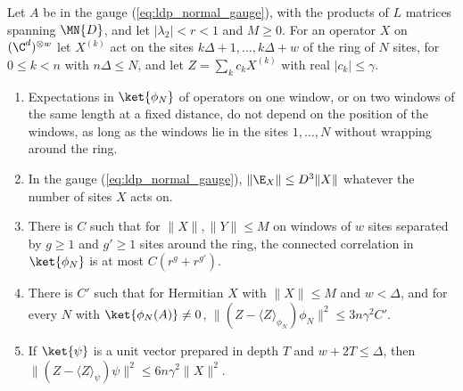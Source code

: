 \begin{lemma}
    \label{lem:ldp_window_averages}
    \leanok
    Let $A$ be in the gauge (\ref{eq:ldp_normal_gauge}), with the products of
    $L$ matrices spanning $\MN{D}$, and let $\lvert\lambda_2\rvert<r<1$ and
    $M\ge0$. For an operator $X$ on $(\C^d)^{\otimes w}$ let $X^{(k)}$ act on
    the sites $k\Delta+1,\dots,k\Delta+w$ of the ring of $N$ sites, for
    $0\le k<n$ with $n\Delta\le N$, and let $Z=\sum_kc_kX^{(k)}$ with real
    $\lvert c_k\rvert\le\gamma$.
    \begin{enumerate}
        \item Expectations in $\ket{\phi_N}$ of operators on one window, or on
              two windows of the same length at a fixed distance, do not depend
              on the position of the windows, as long as the windows lie in the
              sites $1,\dots,N$ without wrapping around the ring.
        \item In the gauge (\ref{eq:ldp_normal_gauge}),
              $\lVert\E_X\rVert\le D^3\lVert X\rVert$ whatever the number of
              sites $X$ acts on.
        \item There is $C$ such that for $\lVert X\rVert,\lVert Y\rVert\le M$
              on windows of $w$ sites separated by $g\ge1$ and $g'\ge1$ sites
              around the ring, the connected correlation in $\ket{\phi_N}$ is at
              most $C(r^g+r^{g'})$.
        \item There is $C'$ such that for Hermitian $X$ with
              $\lVert X\rVert\le M$ and $w<\Delta$, and for every $N$
              with $\ket{\phi_N(A)}\neq0$,
              $\lVert(Z-\langle Z\rangle_{\phi_N})\phi_N\rVert^2\le
                  3n\gamma^2C'$.
        \item If $\ket{\psi}$ is a unit vector prepared in depth $T$ and
              $w+2T\le\Delta$, then
              $\lVert(Z-\langle Z\rangle_\psi)\psi\rVert^2\le
                  6n\gamma^2\lVert X\rVert^2$.
    \end{enumerate}
\end{lemma}
